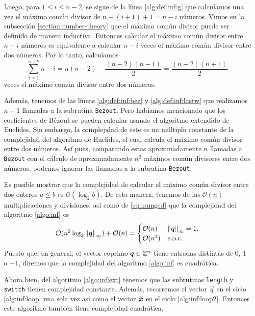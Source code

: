 Luego, para $1 \leq i \leq n - 2$, se sigue de la línea \ref{alg:def:inf:g} que calculamos una vez
el máximo común divisor de $n - (i + 1) + 1 = n - i$ números. Vimos en la subsección
\ref{section:number-theory} que el máximo común divisor puede ser definido de manera inductiva.
Entonces calcular el máximo común divisor entre $n - i$ números es equivalente a calcular $n - i$
veces el máximo común divisor entre dos números. Por lo tanto, calculamos
\begin{equation}
	\label{eq:numgcd}
	\sum_{i=1}^{n-2}n - i = n(n - 2) - \frac{(n-2)(n-1)}{2} = \frac{(n-2)(n+1)}{2}
\end{equation}
veces el máximo común divisor entre dos números.

Además, tenemos de las líneas \ref{alg:def:inf:bez} y \ref{alg:def:inf:lastw} que realizamos $n - 1$
llamadas a la subrutina \texttt{Bezout}. Pero habíamos mencionado que los coeficientes de Bézout se
pueden calcular usando el algoritmo extendido de Euclides. Sin embargo, la complejidad de este es un
múltiplo constante de la complejidad del algoritmo de Euclides, el cual calcula el máximo común
divisor entre dos números. Así pues, comparando estas aproximadamente $n$ llamadas a \texttt{Bezout}
con el cálculo de aproximadamente $n^2$ máximos común divisores entre dos números, podemos ignorar las
llamadas a la subrutina \texttt{Bezout}.

Es posible mostrar que la complejidad de calcular el máximo común divisor entre dos enteros $a \leq
b$ es $\mathcal{O}(\log_2 b)$. De esta manera, tenemos de las $\mathcal{O}(n)$ multiplicaciones y
divisiones, así como de \eqref{eq:numgcd} que la complejidad del algoritmo \ref{algo:inf} es
\begin{equation*}
	\mathcal{O}(n^2\log_2\left\lVert \boldsymbol{q} \right\rVert_\infty) + \mathcal{O}(n) = \begin{cases}
		\mathcal{O}(n) & \left\lVert \boldsymbol{q} \right\rVert_\infty = 1, \\
		\mathcal{O}(n^2) & \text{e.o.c.}
	\end{cases}
\end{equation*}
Puesto que, en general, el vector coprimo $\boldsymbol{q} \in \mathbb{Z}^n$ tiene entradas distintas de $0$, $1$ o
$-1$, diremos que la complejidad del algoritmo \ref{algo:inf} es cuadrática.

Ahora bien, del algoritmo \ref{algo:inf:ext} tenemos que las subrutinas \texttt{length} y
\texttt{switch} tienen complejidad constante. Además, recorremos el vector $\vec{q}$ en el ciclo
\ref{alg:inf:loop} una sola vez así como el vector $\boldsymbol{\tilde{x}}$ en el ciclo \ref{alg:inf:loop2}.
Entonces este algoritmo también tiene complejidad cuadrática.

